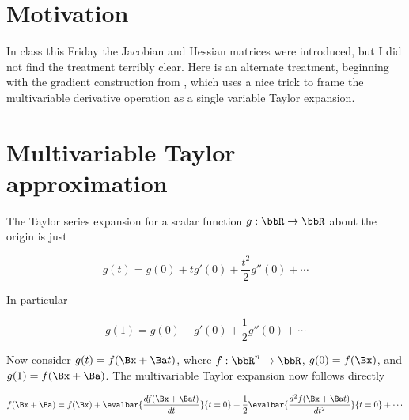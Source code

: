 
\renewcommand{\basename}{jacobianAndHessian}
\renewcommand{\dirname}{notes/ece1228-electromagnetic-theory/}



\usepackage{peeters_layout_exercise}
\usepackage{peeters_braket}
\usepackage{peeters_figures}
\usepackage{siunitx}

\beginArtNoToc


\section{Motivation}

In class this Friday the Jacobian and Hessian matrices were introduced, but I did not find the treatment terribly clear.  Here is an alternate treatment, beginning with the gradient construction from \citep{hestenes1999nfc}, which uses a nice trick to frame the multivariable derivative operation as a single variable Taylor expansion.

\section{Multivariable Taylor approximation}

The Taylor series expansion for a scalar function \( g : \bbR \rightarrow \bbR \) about the origin is just

\begin{dmath}\label{eqn:jacobianAndHessian:20}
g(t) = g(0) + t g'(0) + \frac{t^2}{2} g''(0) + \cdots
\end{dmath}

In particular

\begin{dmath}\label{eqn:jacobianAndHessian:40}
g(1) = g(0) + g'(0) + \frac{1}{2} g''(0) + \cdots
\end{dmath}

Now consider \( g(t) = f( \Bx + \Ba t ) \), where \( f : \bbR^n \rightarrow \bbR \), \( g(0) = f(\Bx) \), and \( g(1) = f(\Bx + \Ba) \).  The multivariable Taylor expansion now follows directly

\begin{dmath}\label{eqn:jacobianAndHessian:60}
f( \Bx + \Ba)
= f(\Bx)
+ \evalbar{\frac{df(\Bx + \Ba t)}{dt}}{t = 0} + \frac{1}{2} \evalbar{\frac{d^2f(\Bx + \Ba t)}{dt^2}}{t = 0} + \cdots
\end{dmath}

